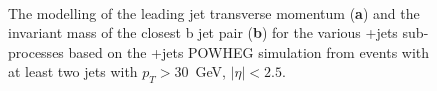 \begin{figure}
\begin{centering}
 \\
\caption[Modelling of the \ttbar+X sub-processes]{The modelling of the leading jet transverse momentum (\textbf{a}) and the invariant mass of the closest b jet pair (\textbf{b}) for the various \ttbar+jets sub-processes based on the \ttbar+jets POWHEG simulation from events with at least two jets with $p_T > 30$~GeV, $|\eta| < 2.5$.}
\label{fig:tth_ttjets_subprocesses}
\end{centering}
\end{figure}

